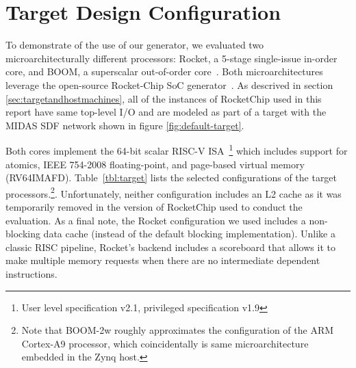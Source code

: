 \section{Target Design Configuration}

To demonstrate of the use of our generator, we evaluated two
microarchitecturally different processors:  Rocket, a 5-stage single-issue
in-order core, and BOOM, a superscalar out-of-order core~\cite{boom}. Both
microarchitectures leverage the open-source Rocket-Chip SoC
generator~\cite{rocketchip}. As descrived in section
\ref{sec:targetandhostmachines}, all of the instances of RocketChip used in
this report have same top-level I/O and are modeled as part of a target with
the MIDAS SDF network shown in figure \ref{fig:default-target}.

Both cores implement the 64-bit scalar RISC-V ISA~\cite{Waterman:EECS-2016-118,
Waterman:EECS-2016-161}\footnote{User level specification v2.1, privileged
specification v1.9} which includes support for atomics, IEEE 754-2008
floating-point, and page-based virtual memory (RV64IMAFD).
Table~\ref{tbl:target} lists the selected configurations of the target
processors.\footnote{Note that BOOM-2w roughly approximates the configuration
of the ARM Cortex-A9 processor, which coincidentally is same microarchitecture
embedded in the Zynq host.}. Unfortunately, neither configuration includes an
L2 cache as it was  temporarily removed in the version of RocketChip used to
conduct the evaluation. As a final note, the Rocket configuration we used
includes a non-blocking data cache (instead of the default blocking
implementation). Unlike a classic RISC pipeline, Rocket's backend includes a
scoreboard that allows it to make multiple memory requests when there are no
intermediate dependent instructions.

\begin{table}
\begin{center}
\end{center}
\caption{Processor Parameters}
\label{tbl:target}
\end{table}%

